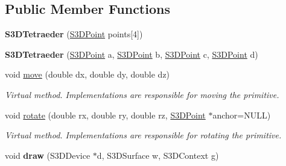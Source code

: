 \subsection*{Public Member Functions}
\begin{DoxyCompactItemize}
\item 
\hypertarget{class_s3_d_tetraeder_ac70078c42e24160a8759fafff847ee30}{
{\bfseries S3DTetraeder} (\hyperlink{class_s3_d_point}{S3DPoint} points\mbox{[}4\mbox{]})}
\label{class_s3_d_tetraeder_ac70078c42e24160a8759fafff847ee30}

\item 
\hypertarget{class_s3_d_tetraeder_a98dc7f23bd82419321b7a086159e25d3}{
{\bfseries S3DTetraeder} (\hyperlink{class_s3_d_point}{S3DPoint} a, \hyperlink{class_s3_d_point}{S3DPoint} b, \hyperlink{class_s3_d_point}{S3DPoint} c, \hyperlink{class_s3_d_point}{S3DPoint} d)}
\label{class_s3_d_tetraeder_a98dc7f23bd82419321b7a086159e25d3}

\item 
\hypertarget{class_s3_d_tetraeder_a3acda1d545e2f078abf299b1c424b7bc}{
void \hyperlink{class_s3_d_tetraeder_a3acda1d545e2f078abf299b1c424b7bc}{move} (double dx, double dy, double dz)}
\label{class_s3_d_tetraeder_a3acda1d545e2f078abf299b1c424b7bc}

\begin{DoxyCompactList}\small\item\em Virtual method. Implementations are responsible for moving the primitive. \item\end{DoxyCompactList}\item 
\hypertarget{class_s3_d_tetraeder_aa06cc6b851e9a3abce9f68830340007a}{
void \hyperlink{class_s3_d_tetraeder_aa06cc6b851e9a3abce9f68830340007a}{rotate} (double rx, double ry, double rz, \hyperlink{class_s3_d_point}{S3DPoint} $\ast$anchor=NULL)}
\label{class_s3_d_tetraeder_aa06cc6b851e9a3abce9f68830340007a}

\begin{DoxyCompactList}\small\item\em Virtual method. Implementations are responsible for rotating the primitive. \item\end{DoxyCompactList}\item 
\hypertarget{class_s3_d_tetraeder_a35594d3c61c89fa1dbe7a6a115cea56b}{
void {\bfseries draw} (S3DDevice $\ast$d, S3DSurface w, S3DContext g)}
\label{class_s3_d_tetraeder_a35594d3c61c89fa1dbe7a6a115cea56b}


\end{DoxyCompactItemize}
